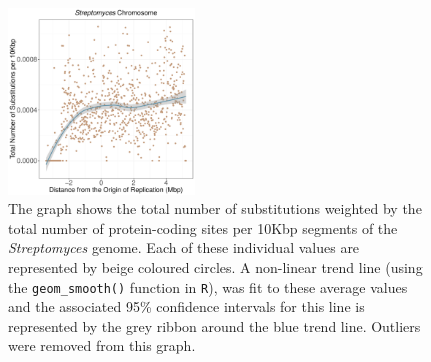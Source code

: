 \documentclass[11pt]{article}
\newcommand{\strep}{\textit{Streptomyces}\xspace}
\providecommand{\DIFaddbegin}{} %
\providecommand{\DIFdelbegin}{} %
\providecommand{\DIFdelend}{} %
\providecommand{\DIFaddbeginFL}{} %
\providecommand{\DIFaddendFL}{} %
\providecommand{\DIFdelbeginFL}{} %
\providecommand{\DIFdelendFL}{} %
\begin{document}
\DIFdelbegin %
\DIFdelend \DIFaddbegin \begin{figure}[H]
	\DIFaddendFL \begin{center}
		\DIFdelbeginFL %
\DIFdelendFL \DIFaddbeginFL \includegraphics[width=0.44\textwidth]{./figs/strep_10KB_weighted_subs_nonpar_14Nov20.pdf}
		\DIFaddendFL \caption{\label{fig:strep_nonpar}The graph shows the total number of substitutions weighted by the total number of protein-coding sites per 10Kbp segments of the \strep genome. Each of these individual values are represented by beige coloured circles. A non-linear trend line (using the \texttt{geom\_smooth()} function in \texttt{R}), was fit to these average values and the associated 95\% confidence intervals for this line is represented by the grey ribbon around the blue trend line. Outliers were removed from this graph.}
	\end{center}
\end{figure}
\end{document}

